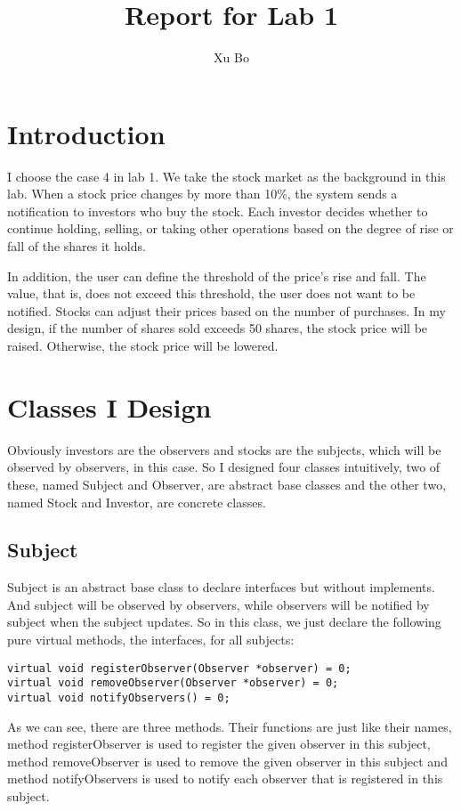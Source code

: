 \documentclass{article}
\title{Report for Lab 1}
\author{Xu Bo}
\date{}
\begin{document}
	\maketitle
	
\section{Introduction}
    I choose the case 4 in lab 1. We take the stock market as the background in this lab. When a stock price changes by more than 10\%, the system sends a notification to investors who buy the stock. Each investor decides whether to continue holding, selling, or taking other operations based on the degree of rise or fall of the shares it holds. 
    
    In addition, the user can define the threshold of the price's rise and fall. The value, that is, does not exceed this threshold, the user does not want to be notified. Stocks can adjust their prices based on the number of purchases. In my design, if the number of shares sold exceeds 50 shares, the stock price will be raised. Otherwise, the stock price will be lowered.

\section{Classes I Design}
    Obviously investors are the observers and stocks are the subjects, which will be observed by observers, in this case. So I designed four classes intuitively, two of these, named Subject and Observer, are abstract base classes and the other two, named Stock and Investor, are concrete classes.
    
\subsection{Subject}
    Subject is an abstract base class to declare interfaces but without implements. And subject will be observed by observers, while observers will be notified by subject when the subject updates. So in this class, we just declare the following pure virtual methods, the interfaces, for all subjects:
    
\begin{lstlisting}
virtual void registerObserver(Observer *observer) = 0;
virtual void removeObserver(Observer *observer) = 0;
virtual void notifyObservers() = 0;
\end{lstlisting}

    As we can see, there are three methods. Their functions are just like their names, method registerObserver is used to register the given observer in this subject, method removeObserver is used to remove the given observer in this subject and method notifyObservers is used to notify each observer that is registered in this subject.
    
\end{document}

